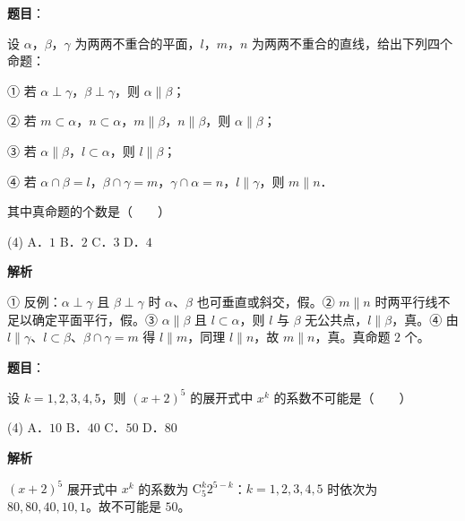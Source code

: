 \begin{answer}

\textbf{题目}：

设 $\alpha$，$\beta$，$\gamma$ 为两两不重合的平面，$l$，$m$，$n$ 为两两不重合的直线，给出下列四个命题：

① 若 $\alpha \perp \gamma$，$\beta \perp \gamma$，则 $\alpha \parallel \beta$；

② 若 $m \subset \alpha$，$n \subset \alpha$，$m \parallel \beta$，$n \parallel \beta$，则 $\alpha \parallel \beta$；

③ 若 $\alpha \parallel \beta$，$l \subset \alpha$，则 $l \parallel \beta$；

④ 若 $\alpha \cap \beta = l$，$\beta \cap \gamma = m$，$\gamma \cap \alpha = n$，$l \parallel \gamma$，则 $m \parallel n$．

其中真命题的个数是\mbox{（　　）}

\begin{gkopts}(4)
\task A．$1$
\task B．$2$
\task C．$3$
\task D．$4$
\end{gkopts}

\textbf{解析}

① 反例：$\alpha \perp \gamma$ 且 $\beta \perp \gamma$ 时 $\alpha$、$\beta$ 也可垂直或斜交，假。② $m \parallel n$ 时两平行线不足以确定平面平行，假。③ $\alpha \parallel \beta$ 且 $l \subset \alpha$，则 $l$ 与 $\beta$ 无公共点，$l \parallel \beta$，真。④ 由 $l \parallel \gamma$、$l \subset \beta$、$\beta \cap \gamma = m$ 得 $l \parallel m$，同理 $l \parallel n$，故 $m \parallel n$，真。真命题 $2$ 个。


\end{answer}
\begin{answer}

\textbf{题目}：

设 $k = 1, 2, 3, 4, 5$，则 $(x + 2)^5$ 的展开式中 $x^k$ 的系数不可能是\mbox{（　　）}

\begin{gkopts}(4)
\task A．$10$
\task B．$40$
\task C．$50$
\task D．$80$
\end{gkopts}

\textbf{解析}

$(x+2)^5$ 展开式中 $x^k$ 的系数为 $\mathrm{C}_5^k 2^{5-k}$：$k = 1, 2, 3, 4, 5$ 时依次为 $80, 80, 40, 10, 1$。故不可能是 $50$。


\end{answer}
